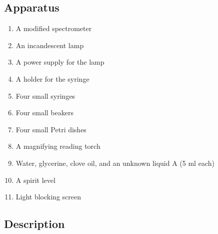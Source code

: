 \subsection*{Apparatus}

\begin{enumerate}
\item A modified spectrometer 
\item An incandescent lamp
\item A power supply for the lamp
\item A holder for the syringe 
\item Four small syringes 
\item Four small beakers 
\item Four small Petri dishes 
\item A magnifying reading torch 
\item Water, glycerine, clove oil, and an unknown liquid A (5 ml each)
\item A spirit level 
\item Light blocking screen
\end{enumerate}


\subsection*{Description}

